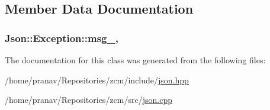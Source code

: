 \subsection{Member Data Documentation}
\subsubsection[{\texorpdfstring{msg\+\_\+}{msg_}}]{ Json\+::\+Exception\+::msg\+\_\+\hspace{0.3cm}{\ttfamily [protected]}, {\ttfamily [inherited]}}\hypertarget{classJson_1_1Exception_aae3cbb8b45bf21480f64502a8329659f}{}\label{classJson_1_1Exception_aae3cbb8b45bf21480f64502a8329659f}


The documentation for this class was generated from the following files\+:\begin{DoxyCompactItemize}
\item 
/home/pranav/\+Repositories/zcm/include/\hyperlink{json_8hpp}{json.\+hpp}\item 
/home/pranav/\+Repositories/zcm/src/\hyperlink{json_8cpp}{json.\+cpp}\end{DoxyCompactItemize}
